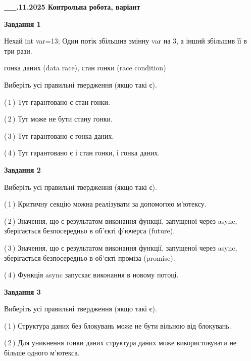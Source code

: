 \documentclass[12pt, ukrainian]{article}
\begin{document}
\begin {large}

\textbf{\_\_.11.2025 Контрольна робота, варіант  }\par


{

\begin{center}
\textbf{Завдання 1}
\end{center}
Нехай int var=13; Один потік збільшив змінну var на 3, а інший збільшив її в три рази.

гонка даних (data race), стан гонки (race condition)

Виберіть усі правильні твердження (якщо такі є).\par
\vspace{2mm}
(\,1\,) Тут гарантовано є стан гонки.%

(\,2\,) Тут може не бути стану гонки.%

(\,3\,) Тут гарантовано є гонка даних.%

(\,4\,) Тут гарантовано є і стан гонки, і гонка даних.%



\begin{center}
\textbf{Завдання 2}
\end{center}
Виберіть усі правильні твердження (якщо такі є).\par
\vspace{2mm}

(\,1\,) Критичну секцію можна реалізувати за допомогою м’ютексу.%

(\,2\,) Значення, що є результатом виконання функції, запущеної через async, зберігається безпосередньо в об’єкті ф’ючерса (future).%

(\,3\,) Значення, що є результатом виконання функції, запущеної через async, зберігається безпосередньо в об’єкті проміза (promise).%

(\,4\,) Функція async запускає виконання в новому потоці.%



\begin{center}
\textbf{Завдання 3}
\end{center}
Виберіть усі правильні твердження (якщо такі є).\par
\vspace{2mm}

(\,1\,) Структура даних без блокувань може не бути вільною від блокувань.%

(\,2\,) Для уникнення гонки даних структура даних може використовувати не більше одного м’ютекса.%

}
\end{large}
\end{document}
